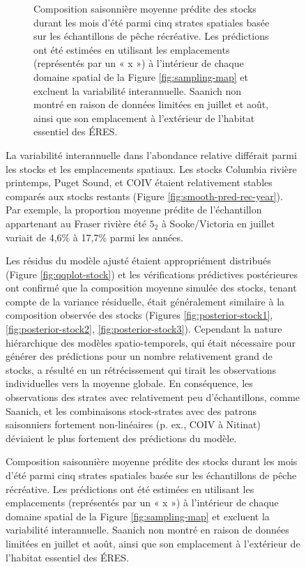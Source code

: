 \begin{figure}[H]
\begin{figure}[H]
    \centering
    \caption{Composition saisonnière moyenne prédite des stocks durant les mois d'été parmi cinq strates spatiales basée sur les échantillons de pêche récréative. Les prédictions ont été estimées en utilisant les emplacements (représentés par un « x ») à l'intérieur de chaque domaine spatial de la Figure \ref{fig:sampling-map} et excluent la variabilité interannuelle. Saanich non montré en raison de données limitées en juillet et août, ainsi que son emplacement à l'extérieur de l'habitat essentiel des ÉRES.}
    \label{fig:stacked-rec}
\end{figure}

La variabilité interannuelle dans l'abondance relative différait parmi les stocks et les emplacements spatiaux. Les stocks Columbia rivière printemps, Puget Sound, et COIV étaient relativement stables comparés aux stocks restants (Figure \ref{fig:smooth-pred-rec-year}). Par exemple, la proportion moyenne prédite de l'échantillon appartenant au Fraser rivière été $5_2$ à Sooke/Victoria en juillet variait de 4,6\% à 17,7\% parmi les années.

Les résidus du modèle ajusté étaient appropriément distribués (Figure \ref{fig:qqplot-stock}) et les vérifications prédictives postérieures ont confirmé que la composition moyenne simulée des stocks, tenant compte de la variance résiduelle, était généralement similaire à la composition observée des stocks (Figures \ref{fig:posterior-stock1}, \ref{fig:posterior-stock2}, \ref{fig:posterior-stock3}). Cependant la nature hiérarchique des modèles spatio-temporels, qui était nécessaire pour générer des prédictions pour un nombre relativement grand de stocks, a résulté en un rétrécissement qui tirait les observations individuelles vers la moyenne globale. En conséquence, les observations des strates avec relativement peu d'échantillons, comme Saanich, et les combinaisons stock-strates avec des patrons saisonniers fortement non-linéaires (p. ex., COIV à Nitinat) déviaient le plus fortement des prédictions du modèle.


\end{figure}
